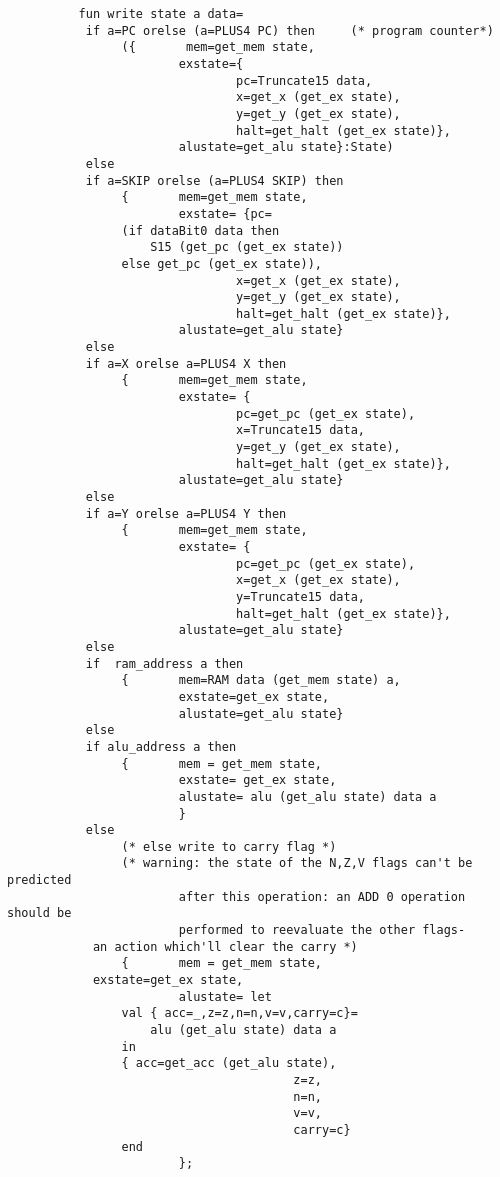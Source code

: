 \begin{verbatim}
          fun write state a data=
           if a=PC orelse (a=PLUS4 PC) then     (* program counter*)
                ({       mem=get_mem state,
                        exstate={
                                pc=Truncate15 data,
                                x=get_x (get_ex state),
                                y=get_y (get_ex state),
                                halt=get_halt (get_ex state)},
                        alustate=get_alu state}:State)
           else
           if a=SKIP orelse (a=PLUS4 SKIP) then
                {       mem=get_mem state,
                        exstate= {pc=
				(if dataBit0 data then
					S15 (get_pc (get_ex state))
				else get_pc (get_ex state)),
                                x=get_x (get_ex state),
                                y=get_y (get_ex state),
                                halt=get_halt (get_ex state)},
                        alustate=get_alu state} 
           else
           if a=X orelse a=PLUS4 X then
                {       mem=get_mem state,
                        exstate= {
                                pc=get_pc (get_ex state),
                                x=Truncate15 data,
                                y=get_y (get_ex state),
                                halt=get_halt (get_ex state)},
                        alustate=get_alu state}
           else
           if a=Y orelse a=PLUS4 Y then
                {       mem=get_mem state,
                        exstate= {
                                pc=get_pc (get_ex state),
                                x=get_x (get_ex state),
                                y=Truncate15 data,
                                halt=get_halt (get_ex state)},
                        alustate=get_alu state}
           else
           if  ram_address a then
                {       mem=RAM data (get_mem state) a,
                        exstate=get_ex state,
                        alustate=get_alu state}
           else
           if alu_address a then
                {       mem = get_mem state,
                        exstate= get_ex state,
                        alustate= alu (get_alu state) data a
                        }
           else
                (* else write to carry flag *)
                (* warning: the state of the N,Z,V flags can't be predicted
                        after this operation: an ADD 0 operation should be
                        performed to reevaluate the other flags-
			an action which'll clear the carry *)
                {       mem = get_mem state,
			exstate=get_ex state,
                        alustate= let
				val { acc=_,z=z,n=n,v=v,carry=c}=
					alu (get_alu state) data a
				in
				{ acc=get_acc (get_alu state),
                                        z=z,
                                        n=n,
                                        v=v,
                                        carry=c}
				end
                        }; 
\end{verbatim}
